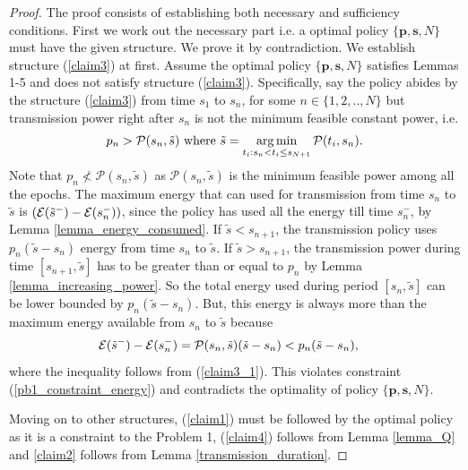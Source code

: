 \begin{proof}

The proof consists of establishing both necessary and sufficiency conditions. First we work out the necessary part i.e. a optimal policy $\{\textbf{p},\textbf{s},N\}$ must have the given structure. We prove it by contradiction. We establish structure (\ref{claim3}) at first. Assume the optimal policy $\{\textbf{p},\textbf{s},N\}$ satisfies Lemmas 1-5 and does not satisfy structure (\ref{claim3}). Specifically, say the policy abides by the  structure (\ref{claim3}) from time $s_{1}$ to $s_n$, for some $n\in \{1,2,..,N\}$ but transmission power right after $s_n$ is not the minimum feasible constant power, i.e.
\begin{align}
p_n>\mathcal{P}(s_n,\tilde{s})\text{ where } \tilde{s}=\argmin_{t_i: s_n < t_i \le s_{N+1}} \mathcal{P}(t_i,s_n).\label{claim3_1}
\end{align}
Note that $p_n\nless \mathcal{P}(s_n,\tilde{s})$ as $\mathcal{P}(s_n,\tilde{s})$ is the minimum feasible power among all the epochs. The maximum energy that can used for transmission from time $s_{n}$ to $\tilde{s}$ is $\left(\mathcal{E}(\tilde{s}^-)-\mathcal{E}(s_{n}^-)\right)$, since the policy has used all the energy till time $s_{n}^-$, by Lemma \ref{lemma_energy_consumed}. If $\tilde{s}<s_{n+1}$, the transmission policy uses $p_n(\tilde{s}-s_{n})$ energy from time $s_n$ to $\tilde{s}$. If $\tilde{s}>s_{n+1}$, the transmission power during time $[s_{n+1},\tilde{s}]$ has to be greater than or equal to $p_n$ by Lemma \ref{lemma_increasing_power}. So the total energy used during period $[s_n,\tilde{s}]$ can be lower bounded by $p_n(\tilde{s}-s_{n})$. But, this energy is always more than the maximum energy available from $s_{n}$ to $\tilde{s}$ because
\begin{align}
&\nonumber\mathcal{E}(\tilde{s}^-)-\mathcal{E}(s_{n}^-)=\mathcal{P}(s_n,\tilde{s})(\tilde{s}-s_{n})<p_n(\tilde{s}-s_{n}),
\end{align}
where the inequality follows from (\ref{claim3_1}). This violates constraint (\ref{pb1_constraint_energy}) and contradicts the optimality of policy $\{\textbf{p},\textbf{s},N\}$.

Moving on to other structures, (\ref{claim1}) must be followed by the optimal policy as it is a constraint to the Problem 1, (\ref{claim4}) follows from Lemma \ref{lemma_Q} and \eqref{claim2} follows from Lemma \ref{transmission_duration}.


\end{proof}
